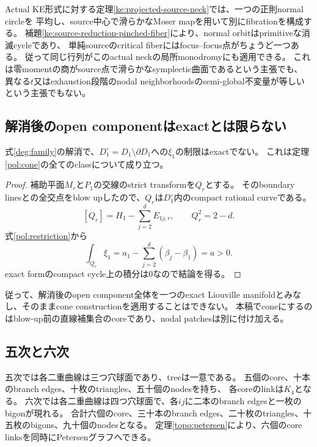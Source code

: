 Actual KE形式に対する定理\ref{ke:projected-source-neck}では、一つの正則normal circleを
平均し、source中心で滑らかなMoser mapを用いて別にfibrationを構成する。
補題\ref{ke:source-reduction-pinched-fiber}により、normal orbitはprimitiveな消滅cycleであり、
単純sourceのcritical fiberにはfocus--focus点がちょうど一つある。
従って同じ行列がこのactual neckの局所monodromyにも適用できる。
これは零momentの商がsource点で滑らかなsymplectic曲面であるという主張でも、
異なる$t$又はexhaustion段階のnodal neighborhoodsのsemi-global不変量が等しいという主張でもない。

\subsection{解消後のopen componentはexactとは限らない}
\begin{proposition}\label{inv:nonexact}
式\eqref{deg:family}の解消で、$D_1^{\circ}=D_1\setminus\partial D_1$への$\xi_1$の制限はexactでない。
これは定理\ref{pol:cone}の全てのclassについて成り立つ。
\end{proposition}
\begin{proof}
補助平面$M_r$と$P_1$の交線のstrict transformを$Q_r$とする。
そのboundary linesとの全交点をblow upしたので、$Q_r$は$D_1^{\circ}$内のcompact rational curveである。
\[
[Q_r]=H_1-\sum_{j=2}^{d}E_{1j,r},\qquad Q_r^2=2-d.
\]
式\eqref{pol:restriction}から
\[
\int_{Q_r}\xi_1
=a_1-\sum_{j=2}^d(\beta_j-\beta_1)=a>0.
\]
exact formのcompact cycle上の積分は0なので結論を得る。
\end{proof}

従って、解消後のopen component全体を一つのexact Liouville manifoldとみなし、そのままcone constructionを適用することはできない。
本稿でconeにするのはblow-up前の直線補集合のcoreであり、nodal patchesは別に付け加える。

\subsection{五次と六次}
五次では各二重曲線は三つ穴球面であり、treeは一意である。
五個のcore、十本のbranch edges、十枚のtriangles、五十個のnodesを持ち、
各coreのlinkは$K_4$となる。
六次では各二重曲線は四つ穴球面で、各$ij$に二本のbranch edgesと一枚のbigonが現れる。
合計六個のcore、三十本のbranch edges、二十枚のtriangles、十五枚のbigons、九十個のnodesとなる。
定理\ref{topo:petersen}により、六個のcore linksを同時にPetersenグラフへできる。


